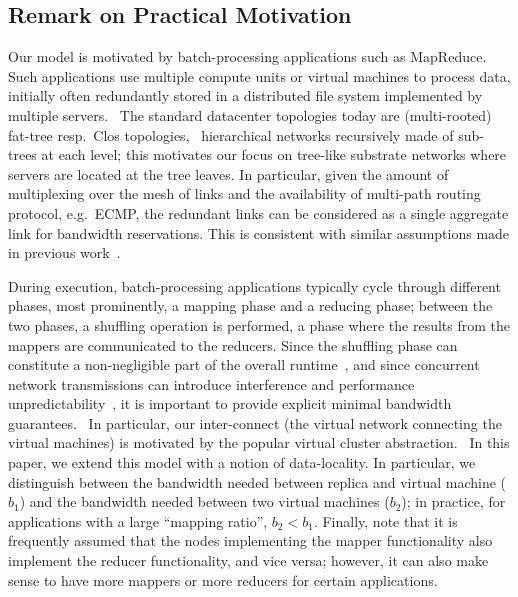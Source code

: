\documentclass[9pt]{sigcomm-alternate}
\newcommand{\CostTrans}{\ensuremath{b_1}}
\newcommand{\CostCom}{\ensuremath{b_2}}
\begin{document}

\subsection{Remark on Practical Motivation}\label{ssec:practice}

Our model is motivated by batch-processing applications such as MapReduce.
Such applications use multiple compute units or virtual machines to
process data, initially often redundantly stored in a distributed file system implemented
by multiple servers.~\cite{mapreduce}
The standard datacenter topologies today are (multi-rooted) fat-tree resp.~Clos topologies,~\cite{vl2,fattree}
hierarchical networks  recursively made of sub-trees at each level; this motivates our 
focus on tree-like substrate networks where servers are located at the
tree leaves. In particular, given the amount of multiplexing over the mesh of links
and the availability of multi-path routing protocol, e.g.~ECMP, the redundant
links can be considered as a single aggregate link for bandwidth
reservations. This is consistent with similar assumptions made in
previous work~\cite{oktopus,proteus}.

During execution, batch-processing applications typically cycle through different phases,
most prominently, a mapping phase and a reducing phase; between the two phases,
a shuffling operation is performed, a phase where the results from the mappers
are communicated to the reducers. Since the shuffling phase can constitute a
non-negligible part of the overall runtime~\cite{orchestra},
and since concurrent network transmissions can introduce interference and
performance unpredictability~\cite{amazonbw}, it is important
to provide explicit minimal bandwidth guarantees.~\cite{talk-about}
In particular, our inter-connect (the virtual network connecting the virtual machines)
is motivated by the popular virtual cluster abstraction.~\cite{oktopus,talk-about,proteus}
In this paper, we extend this model with a notion of data-locality.
In particular, we distinguish between the bandwidth needed between replica
and virtual machine ($\CostTrans$) and the bandwidth needed between
two virtual machines ($\CostCom$); in practice, for applications with a large
``mapping ratio'', $\CostCom<\CostTrans$. Finally, note that it is frequently assumed
that the nodes implementing the mapper functionality also implement the reducer functionality,
and vice versa; however, it can also make sense to have more mappers or more reducers for
certain applications.
\end{document}
